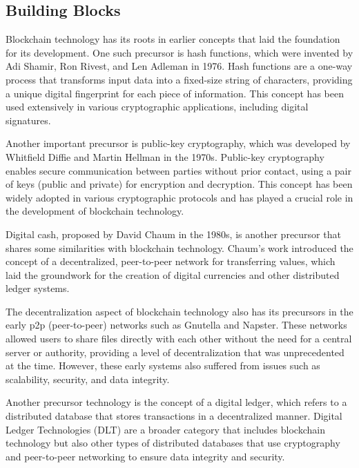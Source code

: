 \begin{documen}

\subsection{Building Blocks}

Blockchain technology has its roots in earlier concepts that laid the foundation for its development. One such precursor is hash functions, which were invented by Adi Shamir, Ron Rivest, and Len Adleman in 1976. Hash functions are a one-way process that transforms input data into a fixed-size string of characters, providing a unique digital fingerprint for each piece of information. This concept has been used extensively in various cryptographic applications, including digital signatures.

Another important precursor is public-key cryptography, which was developed by Whitfield Diffie and Martin Hellman in the 1970s. Public-key cryptography enables secure communication between parties without prior contact, using a pair of keys (public and private) for encryption and decryption. This concept has been widely adopted in various cryptographic protocols and has played a crucial role in the development of blockchain technology.

Digital cash, proposed by David Chaum in the 1980s, is another precursor that shares some similarities with blockchain technology. Chaum's work introduced the concept of a decentralized, peer-to-peer network for transferring values, which laid the groundwork for the creation of digital currencies and other distributed ledger systems.

The decentralization aspect of blockchain technology also has its precursors in the early p2p (peer-to-peer) networks such as Gnutella and Napster. These networks allowed users to share files directly with each other without the need for a central server or authority, providing a level of decentralization that was unprecedented at the time. However, these early systems also suffered from issues such as scalability, security, and data integrity.

Another precursor technology is the concept of a digital ledger, which refers to a distributed database that stores transactions in a decentralized manner. Digital Ledger Technologies (DLT) are a broader category that includes blockchain technology but also other types of distributed databases that use cryptography and peer-to-peer networking to ensure data integrity and security.


\end{documen}
